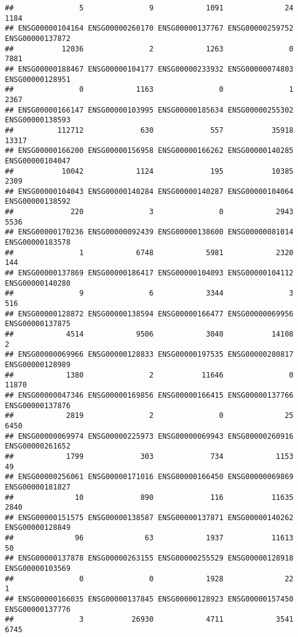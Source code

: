 \documentclass[
]{article}
\begin{document}
\begin{verbatim}
##               5               9            1091              24            1184 
## ENSG00000104164 ENSG00000260170 ENSG00000137767 ENSG00000259752 ENSG00000137872 
##           12036               2            1263               0            7881 
## ENSG00000188467 ENSG00000104177 ENSG00000233932 ENSG00000074803 ENSG00000128951 
##               0            1163               0               1            2367 
## ENSG00000166147 ENSG00000103995 ENSG00000185634 ENSG00000255302 ENSG00000138593 
##          112712             630             557           35918           13317 
## ENSG00000166200 ENSG00000156958 ENSG00000166262 ENSG00000140285 ENSG00000104047 
##           10042            1124             195           10385            2309 
## ENSG00000104043 ENSG00000140284 ENSG00000140287 ENSG00000104064 ENSG00000138592 
##             220               3               0            2943            5536 
## ENSG00000170236 ENSG00000092439 ENSG00000138600 ENSG00000081014 ENSG00000183578 
##               1            6748            5981            2320             144 
## ENSG00000137869 ENSG00000186417 ENSG00000104093 ENSG00000104112 ENSG00000140280 
##               9               6            3344               3             516 
## ENSG00000128872 ENSG00000138594 ENSG00000166477 ENSG00000069956 ENSG00000137875 
##            4514            9506            3040           14108               2 
## ENSG00000069966 ENSG00000128833 ENSG00000197535 ENSG00000280817 ENSG00000128989 
##            1380               2           11646               0           11870 
## ENSG00000047346 ENSG00000169856 ENSG00000166415 ENSG00000137766 ENSG00000137876 
##            2819               2               0              25            6450 
## ENSG00000069974 ENSG00000225973 ENSG00000069943 ENSG00000260916 ENSG00000261652 
##            1799             303             734            1153              49 
## ENSG00000256061 ENSG00000171016 ENSG00000166450 ENSG00000069869 ENSG00000181827 
##              10             890             116           11635            2840 
## ENSG00000151575 ENSG00000138587 ENSG00000137871 ENSG00000140262 ENSG00000128849 
##              96              63            1937           11613              50 
## ENSG00000137878 ENSG00000263155 ENSG00000255529 ENSG00000128918 ENSG00000103569 
##               0               0            1928              22               1 
## ENSG00000166035 ENSG00000137845 ENSG00000128923 ENSG00000157450 ENSG00000137776 
##               3           26930            4711            3541            6745 

\end{verbatim}
\end{document}
